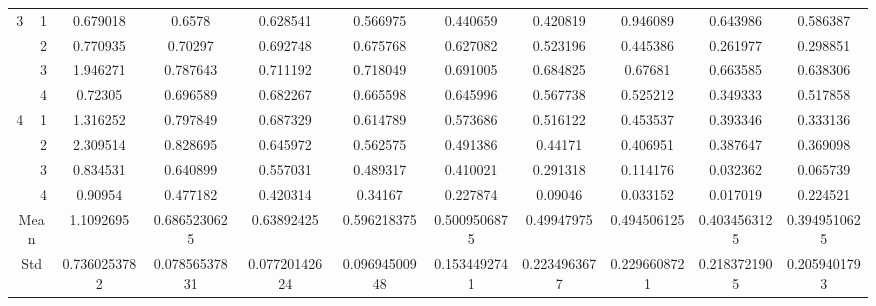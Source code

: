\documentclass[draft,dvipsnames]{drexel-thesis}
\begin{document}
\begin{thesis}
\begin{table}[!t]
{\begin{tabular}{|c|c|c|c|c|c|c|c|c|c|c|}
\multirow{4}{*}{3}    & 1                   & 0.679018     & 0.6578        & 0.628541      & 0.566975      & 0.440659     & 0.420819     & 0.946089     & 0.643986     & 0.586387     \\ \cline{2-11}
                      & 2                   & 0.770935     & 0.70297       & 0.692748      & 0.675768      & 0.627082     & 0.523196     & 0.445386     & 0.261977     & 0.298851     \\ \cline{2-11}
                      & 3                   & 1.946271     & 0.787643      & 0.711192      & 0.718049      & 0.691005     & 0.684825     & 0.67681      & 0.663585     & 0.638306     \\ \cline{2-11}
                      & 4                   & 0.72305      & 0.696589      & 0.682267      & 0.665598      & 0.645996     & 0.567738     & 0.525212     & 0.349333     & 0.517858     \\ \hline
\multirow{4}{*}{4}    & 1                   & 1.316252     & 0.797849      & 0.687329      & 0.614789      & 0.573686     & 0.516122     & 0.453537     & 0.393346     & 0.333136     \\ \cline{2-11}
                      & 2                   & 2.309514     & 0.828695      & 0.645972      & 0.562575      & 0.491386     & 0.44171      & 0.406951     & 0.387647     & 0.369098     \\ \cline{2-11}
                      & 3                   & 0.834531     & 0.640899      & 0.557031      & 0.489317      & 0.410021     & 0.291318     & 0.114176     & 0.032362     & 0.065739     \\ \cline{2-11}
                      & 4                   & 0.90954      & 0.477182      & 0.420314      & 0.34167       & 0.227874     & 0.09046      & 0.033152     & 0.017019     & 0.224521     \\ \hline
\multicolumn{2}{|c|}{Mean}                  & 1.1092695    & 0.6865230625  & 0.63892425    & 0.596218375   & 0.5009506875 & 0.49947975   & 0.494506125  & 0.4034563125 & 0.3949510625 \\ \hline
\multicolumn{2}{|c|}{Std}                   & 0.7360253782 & 0.07856537831 & 0.07720142624 & 0.09694500948 & 0.1534492741 & 0.2234963677 & 0.2296608721 & 0.2183721905 & 0.2059401793 \\ \hline
\end{tabular}}
\end{table}


\end{thesis}
\end{document}
